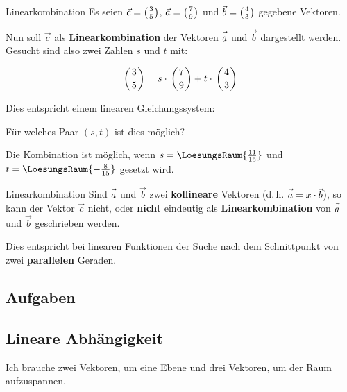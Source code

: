 \begin{beispiel}{Linearkombination}{}
  Es seien $\vec{c} = \left(3 \atop 5\right)$, $\vec{a} = \left(7 \atop
  9\right)$ und $\vec{b} = \left(4 \atop 3\right)$ gegebene Vektoren.

  Nun soll $\vec{c}$ als \textbf{Linearkombination} der Vektoren
  $\vec{a\vphantom{b}}$ und $\vec{b}$ dargestellt werden. Gesucht sind also zwei
  Zahlen $s$ und $t$ mit:

  $$\left(3 \atop 5\right) = s\cdot{} \left(7 \atop 9\right) +
  t\cdot{} \left(4 \atop 3\right)$$

  Dies entspricht einem linearen Gleichungssystem:

  Für welches Paar $(s, t)$ ist dies möglich?
  
  
  Die Kombination ist möglich, wenn $s=\LoesungsRaum{\frac{11}{15}}$ und\\
  $t=\LoesungsRaum{-\frac{8}{15}}$ gesetzt wird.
\end{beispiel}

\begin{bemerkung}{Linearkombination}{}
  Sind $\vec{a\vphantom{b}}$ und $\vec{b}$ zwei \textbf{kollineare} Vektoren
  (d.\,h. $\vec{a\vphantom{b}} = x\cdot{}\vec{b}$), so kann der Vektor $\vec{c}$
  nicht, oder \textbf{nicht} eindeutig als \textbf{Linearkombination} von $\vec{a\vphantom{b}}$ und
  $\vec{b}$ geschrieben werden.

  Dies entspricht bei linearen Funktionen der Suche nach dem
  Schnittpunkt von zwei \textbf{parallelen} Geraden.
  \end{bemerkung}


\subsection*{Aufgaben}

\newpage
\subsection{Lineare Abhängigkeit}

Ich brauche zwei Vektoren, um eine Ebene und drei Vektoren, um der
Raum aufzuspannen.


